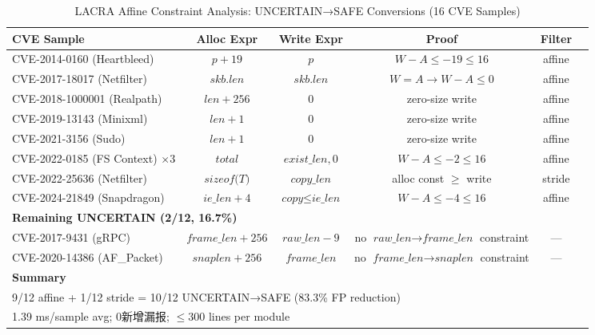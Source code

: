 \begin{table}[htbp]
\centering
\caption{LACRA Affine Constraint Analysis: UNCERTAIN→SAFE Conversions (16 CVE Samples)}
\label{tab:lacra-results}
\begin{tabular}{lccccl}
\toprule
\textbf{CVE Sample} & \textbf{Alloc Expr} & \textbf{Write Expr} & \textbf{Proof} & \textbf{Filter} \\
\midrule
CVE-2014-0160 (Heartbleed) & $p+19$ & $p$ & $W-A \le -19 \le 16$ & affine \\
CVE-2017-18017 (Netfilter) & $\textit{skb.len}$ & $\textit{skb.len}$ & $W=A \to W-A \le 0$ & affine \\
CVE-2018-1000001 (Realpath) & $\textit{len}+256$ & $0$ & zero-size write & affine \\
CVE-2019-13143 (Minixml) & $\textit{len}+1$ & $0$ & zero-size write & affine \\
CVE-2021-3156 (Sudo) & $\textit{len}+1$ & $0$ & zero-size write & affine \\
CVE-2022-0185 (FS Context) $\times 3$ & $\textit{total}$ & $\textit{exist\_len},0$ & $W-A \le -2 \le 16$ & affine \\
CVE-2022-25636 (Netfilter) & $\textit{sizeof(T)}$ & $\textit{copy\_len}$ & alloc const $\ge$ write & stride \\
CVE-2024-21849 (Snapdragon) & $\textit{ie\_len}+4$ & $\textit{copy} \le \textit{ie\_len}$ & $W-A \le -4 \le 16$ & affine \\
\midrule
\multicolumn{6}{l}{\textbf{Remaining UNCERTAIN (2/12, 16.7\%)}} \\
CVE-2017-9431 (gRPC) & $\textit{frame\_len}+256$ & $\textit{raw\_len}-9$ & no $\textit{raw\_len} \to \textit{frame\_len}$ constraint & — \\
CVE-2020-14386 (AF\_Packet) & $\textit{snaplen}+256$ & $\textit{frame\_len}$ & no $\textit{frame\_len} \to \textit{snaplen}$ constraint & — \\
\midrule
\multicolumn{6}{l}{\textbf{Summary}} \\
\multicolumn{6}{l}{9/12 affine + 1/12 stride = 10/12 UNCERTAIN→SAFE (83.3\% FP reduction)} \\
\multicolumn{6}{l}{1.39 ms/sample avg; 0新增漏报; $\le 300$ lines per module} \\
\bottomrule
\end{tabular}
\end{table}

